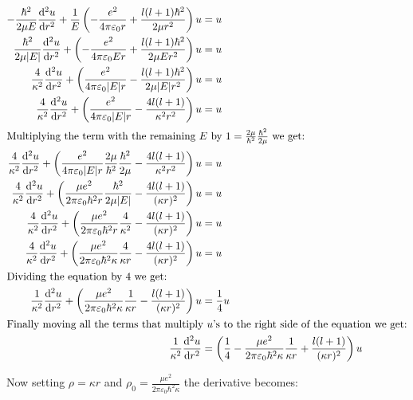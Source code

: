 \documentclass{article}
\begin{document}
    \begin{align}
        -\frac{\hbar^2}{2\mu E}\odv[order = 2]{u}{r} + \frac{1}{E}\left( -\frac{e^2}{4\pi\varepsilon_{0}r} + \frac{l(l + 1)\hbar^2}{2\mu r^2}\right)u &= u \\
        \frac{\hbar^2}{2\mu |E|}\odv[order = 2]{u}{r} + \left( -\frac{e^2}{4\pi\varepsilon_{0}Er} + \frac{l(l + 1)\hbar^2}{2\mu Er^2}\right)u &= u \\
        \frac{4}{\kappa^2}\odv[order = 2]{u}{r} + \left( \frac{e^2}{4\pi\varepsilon_{0}|E|r} - \frac{l(l + 1)\hbar^2}{2\mu |E|r^2}\right)u &= u \\
        \frac{4}{\kappa^2}\odv[order = 2]{u}{r} + \left( \frac{e^2}{4\pi\varepsilon_{0}|E|r} - \frac{4l(l + 1)}{\kappa^2r^2}\right)u &= u \\
        \intertext{Multiplying the term with the remaining $E$ by $1 = \frac{2\mu}{\hbar^2}\frac{\hbar^2}{2\mu}$ we get:}
        \frac{4}{\kappa^2}\odv[order = 2]{u}{r} + \left( \frac{e^2}{4\pi\varepsilon_{0}|E|r}\frac{2\mu}{\hbar^2}\frac{\hbar^2}{2\mu} - \frac{4l(l + 1)}{\kappa^2r^2}\right)u &= u \\
        \frac{4}{\kappa^2}\odv[order = 2]{u}{r} + \left( \frac{\mu e^2}{2\pi\varepsilon_{0}\hbar^2 r}\frac{\hbar^2}{2\mu|E|} - \frac{4l(l + 1)}{(\kappa r)^2}\right)u &= u \\
        \frac{4}{\kappa^2}\odv[order = 2]{u}{r} + \left( \frac{\mu e^2}{2\pi\varepsilon_{0}\hbar^2 r}\frac{4}{\kappa^2} - \frac{4l(l + 1)}{(\kappa r)^2}\right)u &= u \\
        \frac{4}{\kappa^2}\odv[order = 2]{u}{r} + \left( \frac{\mu e^2}{2\pi\varepsilon_{0}\hbar^2\kappa}\frac{4}{\kappa r} - \frac{4l(l + 1)}{(\kappa r)^2}\right)u &= u \\
        \intertext{Dividing the equation by $4$ we get:}
        \frac{1}{\kappa^2}\odv[order = 2]{u}{r} + \left( \frac{\mu e^2}{2\pi\varepsilon_{0}\hbar^2\kappa}\frac{1}{\kappa r} - \frac{l(l + 1)}{(\kappa r)^2}\right)u &= \frac{1}{4}u \\
        \intertext{Finally moving all the terms that multiply $u$'s to the right side of the equation we get:}
        \frac{1}{\kappa^2}\odv[order = 2]{u}{r} &= \left(\frac{1}{4} - \frac{\mu e^2}{2\pi\varepsilon_{0}\hbar^2\kappa}\frac{1}{\kappa r} + \frac{l(l + 1)}{(\kappa r)^2}\right)u
    \end{align}

    Now setting $\rho = \kappa r$ and $\rho_{0} = \frac{\mu e^2}{2 \pi \varepsilon_{0}\hbar^2 \kappa}$ the derivative becomes:
\end{document}
